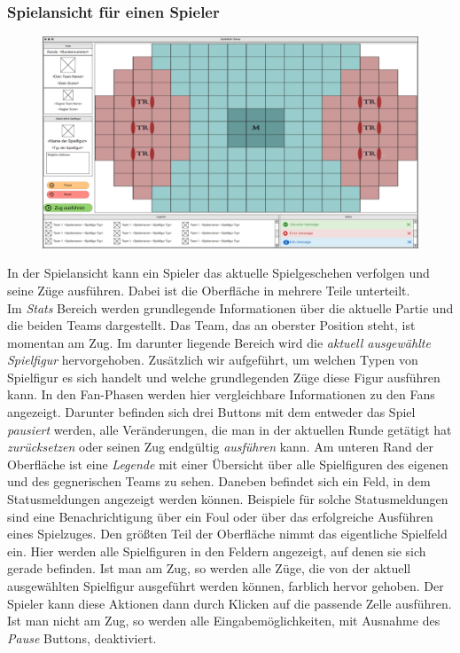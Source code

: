 \subsubsection{Spielansicht für einen Spieler}

\begin{figure}[H]
    \centering
    \includegraphics[width=\textwidth]{../Meilenstein03/images/InGamePlayer.PNG}
\end{figure}

    In der Spielansicht kann ein Spieler das aktuelle Spielgeschehen verfolgen und seine Züge ausführen. Dabei ist die Oberfläche in mehrere Teile unterteilt.\\
    Im \textit{Stats} Bereich werden grundlegende Informationen über die aktuelle Partie und die beiden Teams dargestellt. Das Team, das an oberster Position steht, ist momentan am Zug. Im darunter liegende Bereich wird die \textit{aktuell ausgewählte Spielfigur} hervorgehoben. Zusätzlich wir aufgeführt, um welchen Typen von Spielfigur es sich handelt und welche grundlegenden Züge diese Figur ausführen kann. In den Fan-Phasen werden hier vergleichbare Informationen zu den Fans angezeigt.
    Darunter befinden sich drei Buttons mit dem entweder das Spiel \textit{pausiert} werden, alle Veränderungen, die man in der aktuellen Runde getätigt hat \textit{zurücksetzen} oder seinen Zug endgültig \textit{ausführen} kann. Am unteren Rand der Oberfläche ist eine \textit{Legende} mit einer Übersicht über alle Spielfiguren des eigenen und des gegnerischen Teams zu sehen. Daneben befindet sich ein Feld, in dem Statusmeldungen angezeigt werden können. Beispiele für solche Statusmeldungen sind
    eine Benachrichtigung über ein Foul oder über das erfolgreiche Ausführen eines Spielzuges. Den größten Teil der Oberfläche nimmt das eigentliche Spielfeld ein. Hier werden alle Spielfiguren in den Feldern angezeigt, auf denen sie sich gerade befinden. Ist man am Zug, so werden alle Züge, die von der aktuell ausgewählten Spielfigur ausgeführt werden können, farblich hervor gehoben. Der Spieler kann diese Aktionen dann durch Klicken auf die passende Zelle ausführen. Ist man nicht am
    Zug, so werden alle Eingabemöglichkeiten, mit Ausnahme des \textit{Pause} Buttons, deaktiviert.


